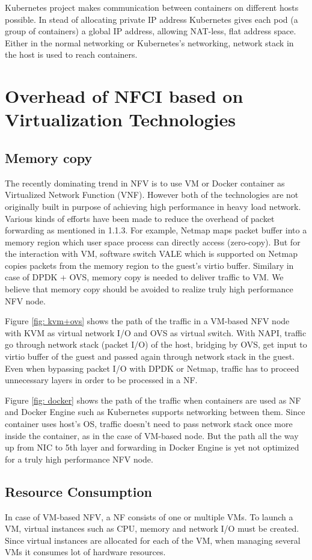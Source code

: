 Kubernetes project makes communication between containers on different hosts possible. In stead of allocating private IP address Kubernetes gives each pod (a group of containers) a global IP address, allowing NAT-less, flat address space. Either in the normal networking or Kubernetes's networking, network stack in the host is used to reach containers. 

\section{Overhead of NFCI based on Virtualization Technologies}
\subsection{Memory copy}
The recently dominating trend in NFV is to use VM or Docker container as Virtualized Network Function (VNF). However both of the technologies are not originally built in purpose of achieving high performance in heavy load network. 
Various kinds of efforts have been made to reduce the overhead of packet forwarding as mentioned in 1.1.3. For example, Netmap maps packet buffer into a memory region which user space process can directly access (zero-copy). But for the interaction with VM, software switch VALE which is supported on Netmap copies packets from the memory region to the guest's virtio buffer. Similary in case of DPDK + OVS, memory copy is needed to deliver traffic to VM. We believe that memory copy should be avoided to realize truly high performance NFV node.

Figure \ref{fig: kvm+ovs} shows the path of the traffic in a VM-based NFV node with KVM as virtual network I/O and OVS as virtual switch. With NAPI, traffic go through network stack (packet I/O) of the host, bridging by OVS, get input to virtio buffer of the guest and passed again through network stack in the guest. Even when bypassing packet I/O with DPDK or Netmap, traffic has to proceed unnecessary layers in order to be processed in a NF. 

Figure \ref{fig: docker} shows the path of the traffic when containers are used as NF and Docker Engine such as Kubernetes supports networking between them. Since container uses host's OS, traffic doesn't need to pass network stack once more inside the container, as in the case of VM-based node. But the path all the way up from NIC to 5th layer and forwarding in Docker Engine is yet not optimized for a truly high performance NFV node. 

\subsection{Resource Consumption}
In case of VM-based NFV, a NF consists of one or multiple VMs. To launch a VM, virtual instances such as CPU, memory and network I/O must be created. Since virtual instances are allocated for each of the VM, when managing several VMs it consumes lot of hardware resources. 

